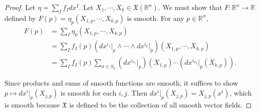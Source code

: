 \documentclass[12pt, psamsfonts]{amsart}
\theoremstyle{definition}
\theoremstyle{remark}
\numberwithin{equation}{section}
\begin{document}
\begin{proof}
  Let $\eta = \sum_{I} f_Idx^I$.
  Let $X_1, \cdots, X_k \in \mathfrak{X}(\mathbb{R}^n)$.
  We must show that $F: \mathbb{R}^n \rightarrow \mathbb{R}$ defined by $F(p) = \eta_p(X_{1, p}, \cdots, X_{k, p})$ is smooth.
  For any $p \in \mathbb{R}^n$,
  \begin{align*}
    F(p)
      &= \sum_{I} \eta_p(X_{1, p}, \cdots, X_{k, p}) \\
      &= \sum_{I} f_I(p)(dx^{i_1}\vert_p \wedge \cdots \wedge dx^{i_k}\vert_p)(X_{1, p}, \cdots, X_{k, p}) \\
      &= \sum_{I} f_I(p) \sum_{\sigma \in S_k} (dx^{i_{\sigma_1}}\vert_p)(X_{1, p}) \cdots (dx^{i_{\sigma_k}}\vert_p(X_{k, p})).
  \end{align*}

  Since products and sums of smooth functions are smooth, it suffices to show $p \mapsto dx^{i}\vert_p(X_{j, p})$ is smooth for each $i, j$.
  Then $dx^i\vert_p(X_{j, p}) = X_{j, p}(x^i)$, which is smooth because $\mathfrak{X}$ is defined to be the collection of all smooth vector fields.
\end{proof}
\end{document}
